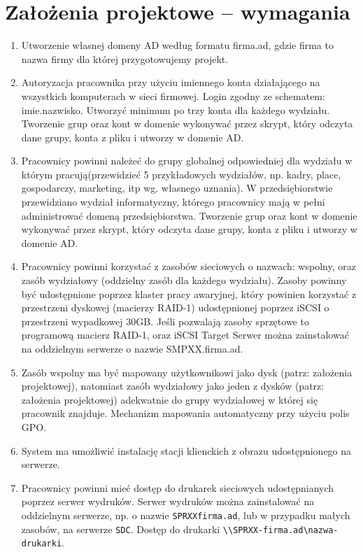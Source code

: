 \section{Założenia projektowe – wymagania}		%
\begin{enumerate}
    \item Utworzenie własnej domeny AD według formatu firma.ad, gdzie firma to nazwa firmy dla której
          przygotowujemy projekt.
    \item Autoryzacja pracownika przy użyciu imiennego konta działającego na wszystkich komputerach w
          sieci firmowej. Login zgodny ze schematem: imie.nazwisko. Utworzyć minimum po trzy konta dla
          każdego wydziału. Tworzenie grup oraz kont w domenie wykonywać przez skrypt, który odczyta
          dane grupy, konta z pliku i utworzy w domenie AD.
    \item Pracownicy powinni należeć do grupy globalnej odpowiedniej dla wydziału w którym
          pracują(przewidzieć 5 przykładowych wydziałów, np. kadry, place, gospodarczy, marketing, itp wg.
          własnego uznania). W przedsiębiorstwie przewidziano wydział informatyczny, którego pracownicy
          mają w pełni administrować domeną przedsiębiorstwa. Tworzenie grup oraz kont w domenie
          wykonywać przez skrypt, który odczyta dane grupy, konta z pliku i utworzy w domenie AD.
    \item Pracownicy powinni korzystać z zasobów sieciowych o nazwach: wspolny, oraz zasób wydziałowy
          (oddzielny zasób dla każdego wydziału). Zasoby powinny być udostępnione poprzez klaster pracy
          awaryjnej, który powinien korzystać z przestrzeni dyskowej (macierzy RAID-1) udostępnionej
          poprzez iSCSI o przestrzeni wypadkowej 30GB. Jeśli pozwalają zasoby sprzętowe to programową
          macierz RAID-1, oraz iSCSI Target Serwer można zainstalować na oddzielnym serwerze o nazwie
          SMPXX.firma.ad.
    \item Zasób wspolny ma być mapowany użytkownikowi jako dysk (patrz: założenia projektowej),
          natomiast zasób wydziałowy jako jeden z dysków (patrz: założenia projektowej) adekwatnie do
          grupy wydziałowej w której się pracownik znajduje. Mechanizm mapowania automatyczny przy
          użyciu polis GPO.
    \item System ma umożliwić instalację stacji klienckich z obrazu udostępnionego na serwerze.
    \item Pracownicy powinni mieć dostęp do drukarek sieciowych udostępnianych poprzez serwer wydruków. Serwer wydruków można zainstalować na oddzielnym serwerze, np. o nazwie \texttt{SPRXXfirma.ad}, lub w przypadku małych zasobów, na serwerze \texttt{SDC}. Dostęp do drukarki \texttt{\textbackslash\textbackslash SPRXX-firma.ad\textbackslash nazwa-drukarki}.

\end{enumerate}
